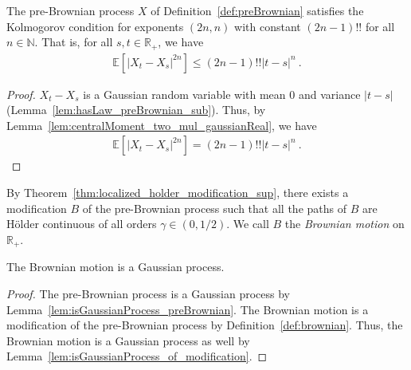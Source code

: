 \begin{lemma}\label{lem:isKolmogorovProcess_preBrownian}
  \leanok
The pre-Brownian process $X$ of Definition~\ref{def:preBrownian} satisfies the Kolmogorov condition for exponents $(2n,n)$ with constant $(2n - 1)!!$ for all $n \in \mathbb{N}$.
That is, for all $s, t \in \mathbb{R}_+$, we have
\begin{align*}
  \mathbb{E} \left[ |X_t - X_s|^{2n} \right] \le (2n - 1)!! |t - s|^n
  \: .
\end{align*}
\end{lemma}

\begin{proof}\leanok
$X_t - X_s$ is a Gaussian random variable with mean $0$ and variance $|t - s|$ (Lemma~\ref{lem:hasLaw_preBrownian_sub}).
Thus, by Lemma~\ref{lem:centralMoment_two_mul_gaussianReal}, we have
\begin{align*}
  \mathbb{E} \left[ |X_t - X_s|^{2n} \right]
  = (2n - 1)!! |t - s|^n
  \: .
\end{align*}
\end{proof}


\begin{definition}\label{def:brownian}
  \leanok
By Theorem~\ref{thm:localized_holder_modification_sup}, there exists a modification $B$ of the pre-Brownian process such that all the paths of $B$ are Hölder continuous of all orders $\gamma \in (0, 1/2)$.
We call $B$ the \emph{Brownian motion} on $\mathbb{R}_+$.
\end{definition}


\begin{lemma}\label{lem:isGaussianProcess_brownian}
  \leanok
The Brownian motion is a Gaussian process.
\end{lemma}

\begin{proof}\leanok
The pre-Brownian process is a Gaussian process by Lemma~\ref{lem:isGaussianProcess_preBrownian}.
The Brownian motion is a modification of the pre-Brownian process by Definition~\ref{def:brownian}.
Thus, the Brownian motion is a Gaussian process as well by Lemma~\ref{lem:isGaussianProcess_of_modification}.
\end{proof}


